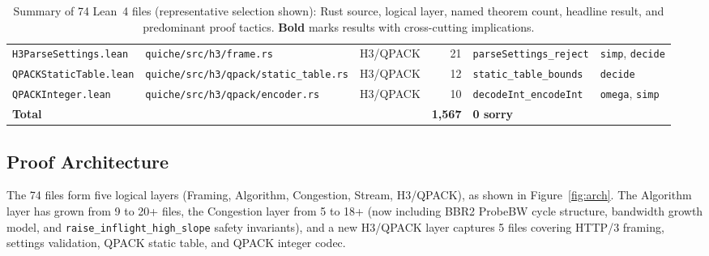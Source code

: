\documentclass[sigconf,10pt]{acmart}
\begin{document}
\begin{table}[t]
\begin{tabular}{lllrll}
\texttt{H3ParseSettings.lean}   & \texttt{quiche/src/h3/frame.rs}               & H3/QPACK& 21  & \texttt{parseSettings\_reject}       & \texttt{simp}, \texttt{decide} \\
\texttt{QPACKStaticTable.lean}  & \texttt{quiche/src/h3/qpack/static\_table.rs} & H3/QPACK& 12  & \texttt{static\_table\_bounds}       & \texttt{decide} \\
\texttt{QPACKInteger.lean}      & \texttt{quiche/src/h3/qpack/encoder.rs}       & H3/QPACK& 10  & \texttt{decodeInt\_encodeInt}        & \texttt{omega}, \texttt{simp} \\
\midrule
\multicolumn{3}{l}{\textbf{Total}}                                               & \textbf{1{,}567} & \textbf{0 sorry} & \\
\bottomrule
\end{tabular}
\caption{Summary of 74 Lean~4 files (representative selection shown): Rust source, logical layer, named
theorem count, headline result, and predominant proof tactics.
\textbf{Bold} marks results with cross-cutting implications.}
\label{tab:theorems}
\end{table}

\subsection{Proof Architecture}

The 74 files form five logical layers (Framing, Algorithm, Congestion,
Stream, H3/QPACK), as shown in Figure~\ref{fig:arch}.
The Algorithm layer has grown from 9 to 20+ files, the Congestion layer from 5 to 18+
(now including BBR2 ProbeBW cycle structure, bandwidth growth model, and
\texttt{raise\_inflight\_high\_slope} safety invariants),
and a new H3/QPACK layer captures 5 files covering HTTP/3 framing, settings
validation, QPACK static table, and QPACK integer codec.
\end{document}
